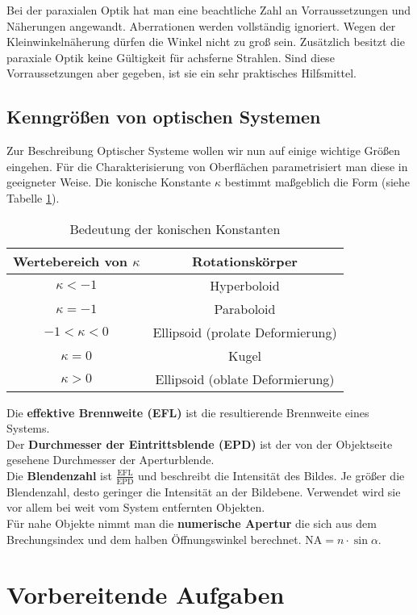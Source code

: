 \documentclass[twoside,colorback,accentcolor=tud4c,11pt]{tudreport}
\begin{document}
		Bei der paraxialen Optik hat man eine beachtliche Zahl an Vorraussetzungen und Näherungen angewandt. Aberrationen werden vollständig ignoriert. Wegen der Kleinwinkelnäherung dürfen die Winkel nicht zu groß sein. Zusätzlich besitzt die paraxiale Optik keine Gültigkeit für achsferne Strahlen. Sind diese Vorraussetzungen aber gegeben, ist sie ein sehr praktisches Hilfsmittel.
\section{Kenngrößen von optischen Systemen}
Zur Beschreibung Optischer Systeme wollen wir nun auf einige wichtige Größen eingehen. Für die Charakterisierung von Oberflächen parametrisiert man diese in geeigneter Weise. Die konische Konstante $ \kappa $ bestimmt maßgeblich die Form (siehe Tabelle \ref{tab:kappa}).
\begin{table}[H]
\centering
\begin{tabular}{|c|c|}
\hline 
Wertebereich von $ \kappa $ & Rotationskörper \\ 
\hline 
$ \kappa <-1 $ & Hyperboloid \\  
$ \kappa =-1 $ & Paraboloid \\ 
$-1< \kappa <0 $ & Ellipsoid (prolate Deformierung) \\ 
$ \kappa =0 $ & Kugel \\ 
$ \kappa >0 $ & Ellipsoid (oblate Deformierung) \\ 
\hline 
\end{tabular} 
\caption{Bedeutung der konischen Konstanten \cite{anl}}\label{tab:kappa}
\end{table}
Die \textbf{effektive Brennweite (EFL)} ist die resultierende Brennweite eines Systems. \\
Der \textbf{Durchmesser der Eintrittsblende (EPD)} ist der von der Objektseite gesehene Durchmesser der Aperturblende. \\
Die \textbf{Blendenzahl} ist $ \frac{\text{EFL}}{\text{EPD}} $ und beschreibt die Intensität des Bildes. Je größer die Blendenzahl, desto geringer die Intensität an der Bildebene. Verwendet wird sie vor allem bei weit vom System entfernten Objekten. \\
Für nahe Objekte nimmt man die \textbf{numerische Apertur} die sich aus dem Brechungsindex und dem halben Öffnungswinkel berechnet. NA$ =n\cdot\sin\alpha $.\\
\chapter{Vorbereitende Aufgaben}
\end{document}
